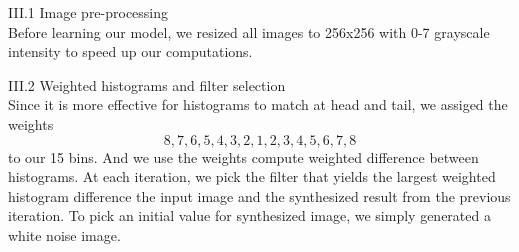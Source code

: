 \documentclass[12pt]{article}
\newenvironment{problem}[2][Part]{\begin{trivlist}
\item[\hskip \labelsep {\bfseries #1}\hskip \labelsep {\bfseries #2}]}{\end{trivlist}}
\begin{document}
\begin{problem}{III Methods}
\item{III.1 Image pre-processing\\}
Before learning our model, we resized all images to 256x256 with 0-7 grayscale intensity to speed up our computations.
\item{III.2 Weighted histograms and filter selection\\}
Since it is more effective for histograms to match at head and tail, we assiged the weights \[8, 7, 6, 5, 4, 3, 2, 1, 2, 3, 4, 5, 6, 7, 8\] to our 15 bins. And we use the weights compute weighted difference between histograms. At each iteration, we pick the filter that yields the largest weighted histogram difference the input image and the synthesized result from the previous iteration. To pick an initial value for synthesized image, we simply generated a white noise image.
\end{problem}
\end{document}
